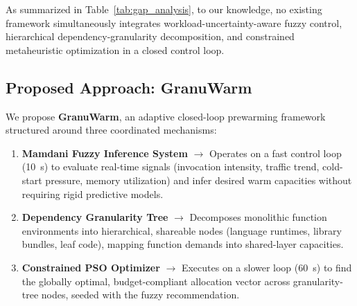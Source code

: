 \documentclass[final,5p,times,twocolumn]{elsarticle}
\begin{document}
As summarized in Table~\ref{tab:gap_analysis}, to our knowledge, no existing framework simultaneously integrates workload-uncertainty-aware fuzzy control, hierarchical dependency-granularity decomposition, and constrained metaheuristic optimization in a closed control loop.

\begin{table}[htbp]
\centering
\caption{Coverage of existing approaches across problem dimensions.}
\label{tab:gap_analysis}
\end{table}

\subsection{Proposed Approach: GranuWarm}

We propose \textbf{GranuWarm}, an adaptive closed-loop prewarming framework structured around three coordinated mechanisms:
\begin{enumerate}
    \item \textbf{Mamdani Fuzzy Inference System} $\rightarrow$ Operates on a fast control loop (10~s) to evaluate real-time signals (invocation intensity, traffic trend, cold-start pressure, memory utilization) and infer desired warm capacities without requiring rigid predictive models.
    \item \textbf{Dependency Granularity Tree} $\rightarrow$ Decomposes monolithic function environments into hierarchical, shareable nodes (language runtimes, library bundles, leaf code), mapping function demands into shared-layer capacities.
    \item \textbf{Constrained PSO Optimizer} $\rightarrow$ Executes on a slower loop (60~s) to find the globally optimal, budget-compliant allocation vector across granularity-tree nodes, seeded with the fuzzy recommendation.
\end{enumerate}
\end{document}
